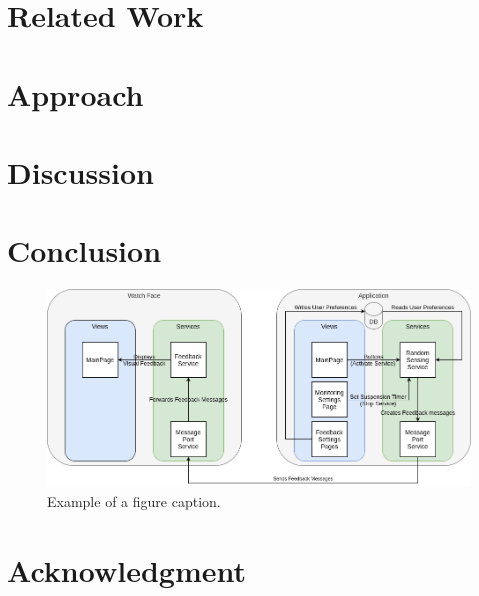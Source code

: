 \documentclass[conference, a4paper, 10pt, twocolumn]{IEEEtran}
\begin{document}
\section{Related Work}

\section{Approach}\label{Approach}

\section{Discussion}

\section{Conclusion}


\begin{figure}[htbp]
\centerline{\includegraphics[width=.5\textwidth]{img/appDiagram.png}}
\caption{Example of a figure caption.}
\label{fig}
\end{figure}

\section*{Acknowledgment}

\printbibliography
\end{document}
